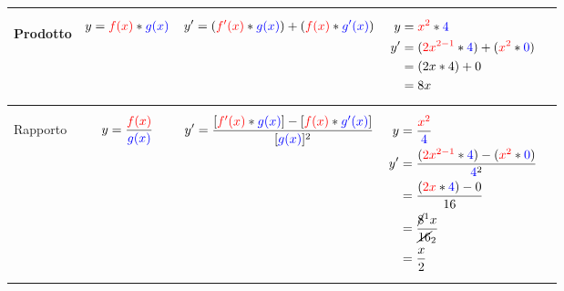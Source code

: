 \documentclass[../../main]{subfiles}
\begin{document}
\begin{center}
\begin{longtable}{ |p{5em} | p{5em} | p{5em} | p{7em} | p{2cm}| }
            \hline
            
            \begin{center}
                Prodotto
            \end{center} &
            \begin{align*}
                y= {\color{red}f(x)} * {\color{blue}g(x)} 
            \end{align*}  &
            \begin{align*}
                y'= ({\color{red}f'(x)} * {\color{blue}g(x)} ) + ( {\color{red}f(x)} * {\color{blue}g'(x)}) 
            \end{align*} &
            {
                \begin{align*}
                    y  &= {\color{red}x^2} * {\color{blue}4}    \\
                    y' &= ( {\color{red}2x^{2-1}} * {\color{blue}4} ) + ( {\color{red}x^2} * {\color{blue}0} )  \\
                        &= (2x * 4) + 0  \\
                        &= 8x  
                \end{align*}
            } &
            \begin{center}
            \end{center} \\ 

            \hline
            
            \begin{center}
                Rapporto
            \end{center} &
            \begin{align*}
                y= \frac{\color{red}f(x)}{\color{blue}g(x)} 
            \end{align*}  &
            \begin{align*}
                y'= \frac{[{\color{red}f'(x)} * {\color{blue}g(x)} ] - [ {\color{red}f(x)} * {\color{blue}g'(x)}]}{[{\color{blue}g(x)}]^2} 
            \end{align*} &
            {
                \begin{align*}
                    y  &= \frac{\color{red}x^2}{\color{blue}4}    \\
                    y' &= \frac{( {\color{red}2x^{2-1}} * {\color{blue}4} ) - ( {\color{red}x^2} * {\color{blue}0} )}{{\color{blue}4}^2}  \\
                        &= \frac{({\color{red}2x} * {\color{blue}4}) - 0}{16}  \\
                        &= \frac{\cancel{8}^1x}{\cancel{16}_2}   \\
                        &= \frac{x}{2} 
                \end{align*}
            } &
            \begin{center}
            \end{center} \\ 


\end{longtable}
\end{center}
\end{document}
